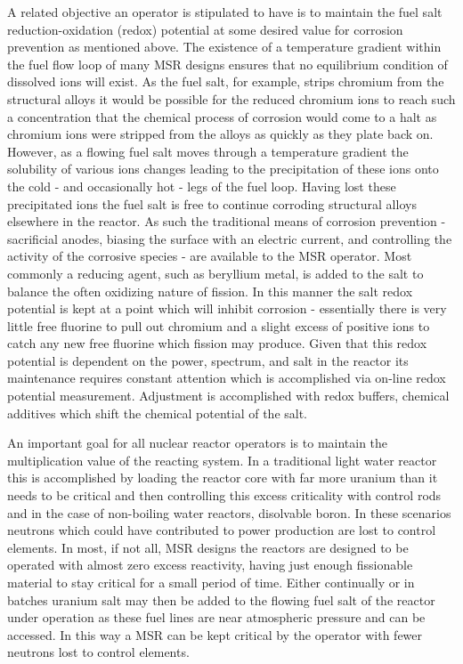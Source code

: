 A related objective an operator is stipulated to have is to maintain the fuel
salt reduction-oxidation (redox) potential at some desired value for corrosion
prevention as mentioned above. The existence of a temperature gradient within
the fuel flow loop of many MSR designs ensures that no equilibrium condition of
dissolved ions will exist. As the fuel salt, for example, strips chromium from
the structural alloys it would be possible for the reduced chromium ions to
reach such a concentration that the chemical process of corrosion would come to
a halt as chromium ions were stripped from the alloys as quickly as they
plate back on. However, as a flowing fuel salt moves through a temperature
gradient the solubility of various ions changes leading to the precipitation of
these ions onto the cold - and occasionally hot - legs of the fuel loop. Having
lost these precipitated ions the fuel salt is free to continue corroding
structural alloys elsewhere in the reactor. As such the traditional means of 
corrosion prevention - sacrificial anodes, biasing the surface with an electric
current, and controlling the activity of the corrosive species - are available
to the MSR operator. Most commonly a reducing agent, such as beryllium metal,
is added to the salt to balance the often oxidizing nature of fission. In
this manner the salt redox potential is kept at a point which will inhibit
corrosion - essentially there is very little free fluorine to pull out chromium
and a slight excess of positive ions to catch any new free fluorine which
fission may produce. Given that this redox potential is dependent on the power,
spectrum, and salt in the reactor its maintenance requires constant attention
which is accomplished via on-line redox potential measurement. Adjustment
is accomplished with redox buffers, chemical additives which shift the
chemical potential of the salt.

An important goal for all nuclear reactor
operators is to maintain the multiplication value of the reacting system. In a
traditional light water reactor this is accomplished by loading the reactor
core with far more uranium than it needs to be critical and then controlling
this excess criticality with control rods and in the case of non-boiling water
reactors, disolvable boron. In these scenarios neutrons which could have
contributed to power production are lost to control elements. In most, if not
all, MSR designs the reactors are designed to be operated with almost zero
excess reactivity, having just enough fissionable material to stay critical for
a small period of time. Either continually or in batches uranium salt may then
be added to the flowing fuel salt of the reactor under operation as these fuel
lines are near atmospheric pressure and can be accessed. In this way a MSR can
be kept critical by the operator with fewer neutrons lost to control elements.

